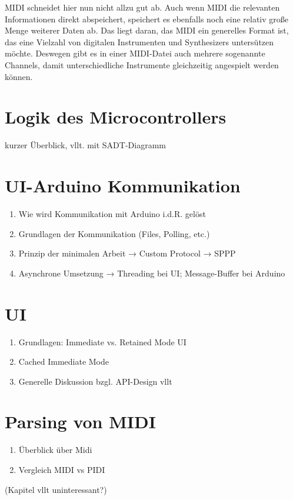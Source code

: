MIDI schneidet hier nun nicht allzu gut ab.
Auch wenn MIDI die relevanten Informationen direkt abspeichert, speichert es ebenfalls noch eine relativ große Menge weiterer Daten ab.
Das liegt daran, das MIDI ein generelles Format ist, das eine Vielzahl von digitalen Instrumenten und Synthesizers untersützen möchte.
Deswegen gibt es in einer MIDI-Datei auch mehrere sogenannte Channels, damit unterschiedliche Instrumente gleichzeitig angespielt werden können.


\section{Logik des Microcontrollers} \label{vorgehenSW-MC}
kurzer Überblick, vllt. mit SADT-Diagramm

\section{UI-Arduino Kommunikation} \label{vorgehenSW-SPPP}
\begin{enumerate}
	\item Wie wird Kommunikation mit Arduino i.d.R. gelöst
	\item Grundlagen der Kommunikation (Files, Polling, etc.)
	\item Prinzip der minimalen Arbeit → Custom Protocol → SPPP
	\item Asynchrone Umsetzung → Threading bei UI; Message-Buffer bei Arduino
\end{enumerate}

\section{UI} \label{vorgehenSW-UI}
\begin{enumerate}
	\item Grundlagen: Immediate vs. Retained Mode UI
	\item Cached Immediate Mode
	\item Generelle Diskussion bzgl. API-Design vllt
\end{enumerate}

\section{Parsing von MIDI} \label{vorgehenSW-MIDI}
\begin{enumerate}
	\item Überblick über Midi
	\item Vergleich MIDI vs PIDI
\end{enumerate}
(Kapitel vllt uninteressant?)